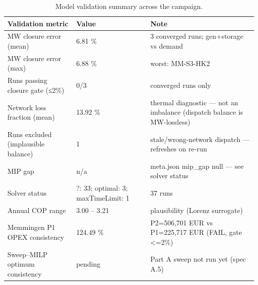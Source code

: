 \begin{table}[htbp]
  \centering
  \caption{Model validation summary across the campaign.}
  \label{tab:t5_validation}
  \begin{tabular}{lll}
  \toprule
  Validation metric & Value & Note \\
  \midrule
  MW closure error (mean) & 6.81 \% & 3 converged runs; gen+storage vs demand \\
  MW closure error (max) & 6.88 \% & worst: MM-S3-HK2 \\
  Runs passing closure gate (≤2\%) & 0/3 & converged runs only \\
  Network loss fraction (mean) & 13.92 \% & thermal diagnostic — not an imbalance (dispatch balance is MW-lossless) \\
  Runs excluded (implausible balance) & 1 & stale/wrong-network dispatch — refreshes on re-run \\
  MIP gap & n/a & meta.json mip\_gap null — see solver status \\
  Solver status & ?: 33; optimal: 3; maxTimeLimit: 1 & 37 runs \\
  Annual COP range & 3.00 -- 3.21 & plausibility (Lorenz surrogate) \\
  Memmingen P1 OPEX consistency & 124.49 \% & P2=506,701 EUR vs P1=225,717 EUR (FAIL, gate <=2\%) \\
  Sweep--MILP optimum consistency & pending & Part A sweep not run yet (spec A.5) \\
  \bottomrule
  \end{tabular}
\end{table}
